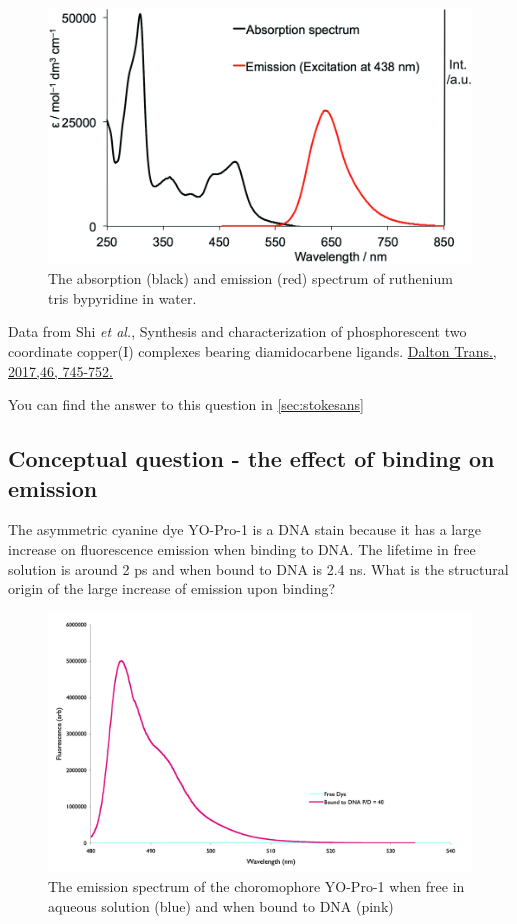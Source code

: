 \documentclass[
]{book}
\begin{document}
\begin{figure}

{\centering \includegraphics[width=0.7\linewidth]{images/Rubpy3spectra} 

}

\caption{The absorption (black) and emission (red) spectrum of ruthenium tris bypyridine in water.}\label{fig:Rubpyspec}
\end{figure}

Data from Shi \emph{et al.}, Synthesis and characterization of phosphorescent two coordinate copper(I) complexes bearing diamidocarbene ligands. \href{https://doi.org/10.1039/C6DT04016K}{Dalton Trans., 2017,46, 745-752.}

You can find the answer to this question in \ref{sec:stokesans}

\hypertarget{sec:binding}{%
\subsection{Conceptual question - the effect of binding on emission}\label{sec:binding}}

The asymmetric cyanine dye YO-Pro-1 is a DNA stain because it has a large increase on fluorescence emission when binding to DNA. The lifetime in free solution is around 2 ps and when bound to DNA is 2.4 ns. What is the structural origin of the large increase of emission upon binding?

\begin{figure}

{\centering \includegraphics[width=0.7\linewidth]{images/YODNA} 

}

\caption{The emission spectrum of the choromophore YO-Pro-1 when free in aqueous solution (blue) and when bound to DNA (pink)}\label{fig:YODNA}
\end{figure}
\end{document}
